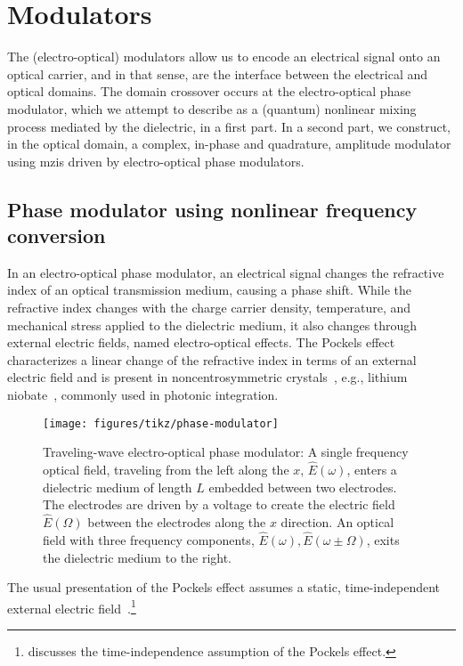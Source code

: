 \section{Modulators}

The (electro-optical) modulators allow us to encode an electrical signal onto an optical carrier, and in that sense, are the interface between the electrical and optical domains.
The domain crossover occurs at the electro-optical phase modulator, which we attempt to describe as a (quantum) nonlinear mixing process mediated by the dielectric, in a first part.
In a second part, we construct, in the optical domain, a complex, in-phase and quadrature, amplitude modulator using \gls{mzi}s driven by electro-optical phase modulators.

\subsection{Phase modulator using nonlinear frequency conversion}

In an electro-optical phase modulator, an electrical signal changes the refractive index of an optical transmission medium, causing a phase shift.
While the refractive index changes with the charge carrier density, temperature, and mechanical stress applied to the dielectric medium, it also changes through external electric fields, named electro-optical effects.
The Pockels effect characterizes a linear change of the refractive index in terms of an external electric field and is present in noncentrosymmetric crystals~\cite[p.~2]{Boyd2020}, e.g., lithium niobate~\cite[p.~237]{Yariv1984}, commonly used in photonic integration.
\begin{figure}[htb]
    \centering
    \texttt{[image: figures/tikz/phase-modulator]}
    \caption{Traveling-wave electro-optical phase modulator: A single frequency optical field, traveling from the left along the $x$, $\hat{E}(\omega)$, enters a dielectric medium of length $L$ embedded between two electrodes. The electrodes are driven by a voltage to create the electric field $\hat{E}(\Omega)$ between the electrodes along the $x$ direction. An optical field with three frequency components, $\hat{E}(\omega),\hat{E}(\omega\pm\Omega)$, exits the dielectric medium to the right.}\label{fig:phase_modulator}
\end{figure}



The usual presentation of the Pockels effect assumes a static, time-independent external electric field~\cite[Ch.~18]{Saleh2007}.\footnote{ discusses the time-independence assumption of the Pockels effect.}


